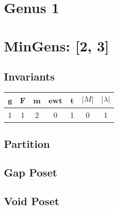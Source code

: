 \documentclass[a4paper]{article}
\begin{document}
\tableofcontents
\newpage
\newpage
\section{Genus 1}
\newpage\section{MinGens: [2, 3]}
\noindent\begin{minipage}{0.6\textwidth}
\subsection*{Invariants}
\centering
\begin{tabular}{|c|c|c|c|c|c|c|}
\toprule
g & F & m & ewt & t & \(|M|\) & \(|\lambda|\) \\
\midrule
1 & 1 & 2 & 0 & 1 & 0 & 1 \\
\bottomrule
\end{tabular}
\end{minipage}%
\begin{minipage}{0.4\textwidth}
\subsection*{Partition}
\centering
{}
\end{minipage}
\vspace{1cm}
\noindent \newline\begin{minipage}{0.48\textwidth}
\subsection*{Gap Poset}
\centering
{}
\end{minipage}%
\hfill\begin{minipage}{0.48\textwidth}
\subsection*{Void Poset}
\centering
\end{minipage}
\newpage
\end{document}
